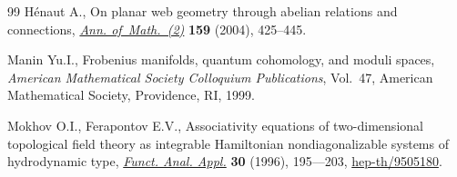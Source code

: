 \documentclass[pdftex]{sigma}
\begin{document}
\begin{thebibliography}{99}
H{\'e}naut A., On planar web geometry through abelian relations and
  connections, \href{http://dx.doi.org/10.4007/annals.2004.159.425}{\textit{Ann. of~Math.~(2)}} \textbf{159} (2004), 425--445.

Manin Yu.I., Frobenius manifolds, quantum cohomology, and moduli spaces,
  \textit{American Mathematical Society Colloquium Publications}, Vol.~47,
  American Mathematical Society, Providence, RI, 1999.

Mokhov O.I., Ferapontov E.V., Associativity equations of two-dimensional
  topological f\/ield theory as integrable {H}amiltonian nondiagonalizable
  systems of hydrodynamic type, \href{http://dx.doi.org/10.1007/BF02509506}{\textit{Funct. Anal. Appl.}} \textbf{30} (1996),
  195–--203, \href{http://arxiv.org/abs/hep-th/9505180}{hep-th/9505180}.

\end{thebibliography}\LastPageEnding
\end{document}
